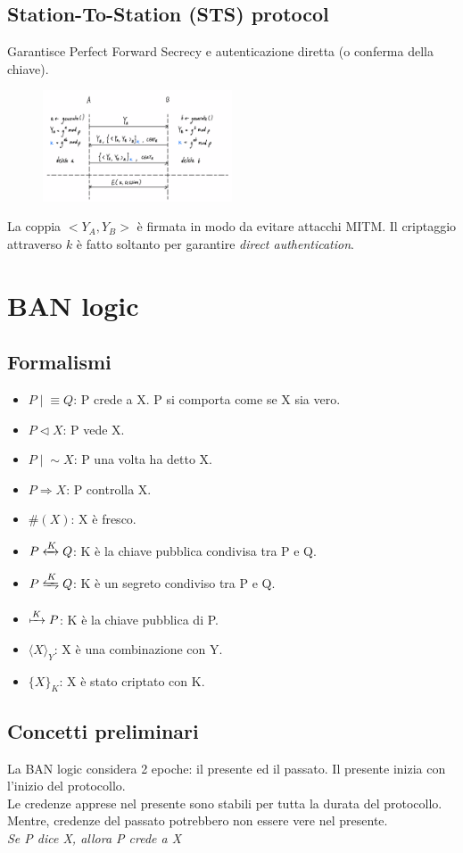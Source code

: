 \documentclass[a4paper,12pt]{article}
\newcommand{\believes}{\mid\!\equiv}
\newcommand{\sees}{\triangleleft}
\newcommand{\oncesaid}{\mid\!\sim}
\newcommand{\controls}{\Rightarrow}
\newcommand{\fresh}[1]{\#(#1)}
\newcommand{\combine}[2]{{\langle #1 \rangle}_{#2}}
\newcommand{\encrypt}[2]{{ \{ #1 \} }_{#2}}
\newcommand{\sharekey}[1]{\xleftrightarrow{#1}}
\newcommand{\pubkey}[1]{\xmapsto{#1}}
\newcommand{\secret}[1]{\xleftrightharpoons{#1}}
\begin{document}
\subsection{Station-To-Station (STS) protocol}
Garantisce Perfect Forward Secrecy e autenticazione diretta (o conferma della chiave).

\begin{figure}[H]
  \centering
  \includegraphics[width=0.5\textwidth]{img/sts}
\end{figure}
La coppia $<Y_A,Y_B>$ è firmata in modo da evitare attacchi MITM. Il criptaggio attraverso $k$ è fatto soltanto per garantire \textit{direct authentication}.

\newpage

\section{BAN logic}
\subsection{Formalismi}
\begin{itemize}
	\item $P \believes Q$: P crede a X. P si comporta come se X sia vero.
	\item $P \sees X$: P vede X.
	\item $P \oncesaid X$: P una volta ha detto X.
	\item $P \controls X$: P controlla X.
	\item $\fresh{X}$: X è fresco.
	\item $P \sharekey{K} Q$: K è la chiave pubblica condivisa tra P e Q.
	\item $P \secret{K} Q$: K è un segreto condiviso tra P e Q.
	\item $\pubkey{K} P$: K è la chiave pubblica di P.
	\item $\combine{X}{Y}$: X è una combinazione con Y.
	\item $\encrypt{X}{K}$: X è stato criptato con K.
\end{itemize}

\subsection{Concetti preliminari}
La BAN logic considera 2 epoche: il presente ed il passato. Il presente inizia con l'inizio del protocollo. \\
Le credenze apprese nel presente sono stabili per tutta la durata del protocollo. Mentre, credenze del passato potrebbero non essere vere nel presente. \\
\textit{Se P dice X, allora P crede a X}
\end{document}
